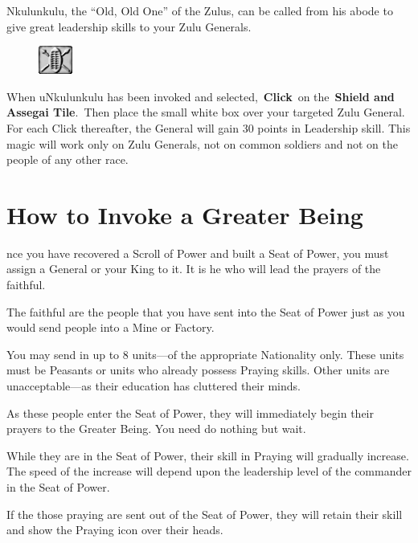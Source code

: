 Nkulunkulu, the “Old, Old One” of the Zulus, can be called from his abode to give great leadership skills to your Zulu Generals.

\begin{figure}
	\vspace{-20pt}
	\begin{center}
		\includegraphics[width=0.1\textwidth]{Toldone}
	\end{center}
	\vspace{-20pt}
\end{figure}

When uNkulunkulu has been invoked and selected, \textbf{Click} on the \textbf{Shield and Assegai Tile}. Then place the small white box over your targeted Zulu General. For each Click thereafter, the General will gain 30 points in Leadership skill. This magic will work only on Zulu Generals, not on common soldiers and not on the people of any other race.

\section{How to Invoke a Greater Being}

nce you have recovered a Scroll of Power and built a Seat of Power, you must assign a General or your King to it. It is he who will lead the prayers of the faithful.

The faithful are the people that you have sent into the Seat of Power just as you would send people into a Mine or Factory.

You may send in up to 8 units---of the appropriate Nationality only. These units must be Peasants or units who already possess Praying skills. Other units are unacceptable---as their education has cluttered their minds.

As these people enter the Seat of Power, they will immediately begin their prayers to the Greater Being. You need do nothing but wait.

While they are in the Seat of Power, their skill in Praying will gradually increase. The speed of the increase will depend upon the leadership level of the commander in the Seat of Power.

If the those praying are sent out of the Seat of Power, they will retain their skill and show the Praying icon over their heads.

